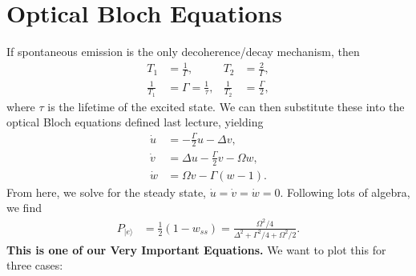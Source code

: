 \documentclass[lasers.tex]{subfiles}
\begin{document}
\section{Optical Bloch Equations}
If spontaneous emission is the only decoherence/decay mechanism, then
\begin{align}
    T_1 &= \frac{1}{\Gamma}, & T_2 &= \frac2\Gamma, \\ 
    \frac{1}{T_1} &= \Gamma = \frac1\tau, & \frac1{T_2} &= \frac{\Gamma}{2}, 
\end{align}
where $\tau$ is the lifetime of the excited state.
We can then substitute these into the optical Bloch equations defined last lecture, yielding
\begin{align}
    \dot{u} &= -\frac{\Gamma}{2}u - \Delta v, \\
    \dot{v} &= \Delta u - \frac{\Gamma}{2}v - \Omega w, \\
    \dot{w} &= \Omega v - \Gamma(w-1).
\end{align}
From here, we solve for the steady state, $\dot u = \dot v = \dot w = 0.$
Following lots of algebra, we find
\begin{align}
    P_{|e\rangle} &= \frac12\left(1-w_{ss}\right) = \frac{\Omega^2/4}{\Delta^2 + \Gamma^2/4 + \Omega^2/2}.
\end{align}
\textbf{This is one of our Very Important Equations.}
We want to plot this for three cases:
\end{document}
